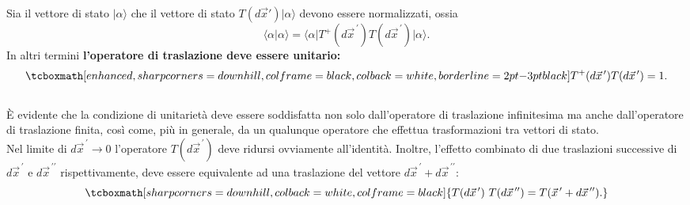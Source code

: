 \documentclass[a4paper,12pt,oneside]{book}
\begin{document}
Sia il vettore di stato $\vert \alpha \rangle$ che il vettore di stato $T(d\vec{x}') \vert \alpha \rangle$ devono essere normalizzati, ossia
	\begin{equation}
		\langle \alpha \vert \alpha \rangle = \langle \alpha \vert T^+(d{\vec{x}}^{\, \prime}) T(d{\vec{x}}^{\, \prime}) \vert \alpha \rangle .
	\end{equation}
In altri termini \textbf{l'operatore di traslazione deve essere unitario:}
	\begin{equation}
		\tcboxmath[enhanced, sharp corners=downhill, colframe=black, colback=white, borderline={2pt}{-3pt}{black}]{
			T^+(d{\vec{x}}^{\, \prime}) T(d{\vec{x}}^{\, \prime}) =1 .
			}
	\end{equation}\\
	
È evidente che la condizione di unitarietà deve essere soddisfatta non solo dall'operatore di traslazione infinitesima ma anche dall'operatore di traslazione finita, così come, più in generale, da un qualunque operatore che effettua trasformazioni tra vettori di stato.\\

Nel limite di $d{\vec{x}}^{\, \prime} \rightarrow 0$ l'operatore $T(d{\vec{x}}^{\, \prime})$ deve ridursi ovviamente all'identità. Inoltre, l'effetto combinato di due traslazioni successive di $d{\vec{x}}^{\, \prime}$ e $d{\vec{x}}^{\, \prime \prime}$ rispettivamente, deve essere equivalente ad una traslazione del vettore $d{\vec{x}}^{\, \prime}+d{\vec{x}}^{\, \prime \prime}$: 
	\begin{equation}
		\tcboxmath[sharp corners=downhill, colback=white, colframe=black]{
			T(d{\vec{x}}^{\, \prime})\ T(d{\vec{x}}^{\, \prime \prime}) = T({\vec{x}}^{\, \prime}+d{\vec{x}}^{\, \prime \prime}).
			}
	\end{equation}\\
	
\end{document}
